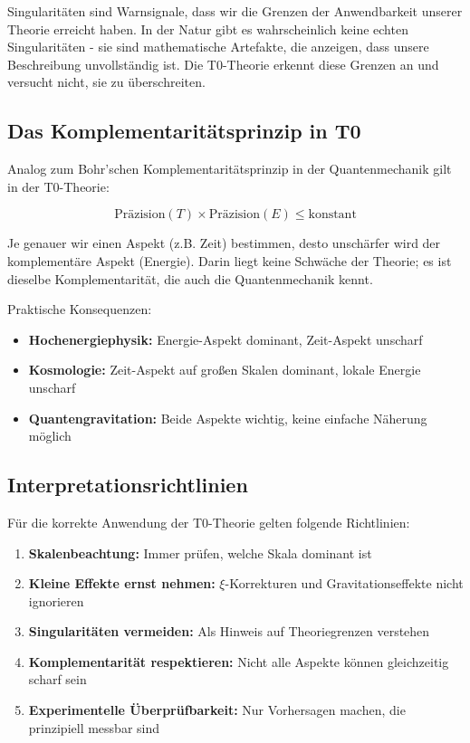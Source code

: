 	Singularitäten sind Warnsignale, dass wir die Grenzen der Anwendbarkeit unserer Theorie erreicht haben. In der Natur gibt es wahrscheinlich keine echten Singularitäten - sie sind mathematische Artefakte, die anzeigen, dass unsere Beschreibung unvollständig ist. Die T0-Theorie erkennt diese Grenzen an und versucht nicht, sie zu überschreiten.
	
	\subsection{Das Komplementaritätsprinzip in T0}
	
	Analog zum Bohr'schen Komplementaritätsprinzip in der Quantenmechanik gilt in der T0-Theorie:
	
	\begin{equation}
		\text{Präzision}(T) \times \text{Präzision}(E) \leq \text{konstant}
	\end{equation}
	
	Je genauer wir einen Aspekt (z.B. Zeit) bestimmen, desto unschärfer wird der komplementäre Aspekt (Energie). Darin liegt keine Schwäche der Theorie; es ist dieselbe Komplementarität, die auch die Quantenmechanik kennt.
	
	Praktische Konsequenzen:
	\begin{itemize}
		\item \textbf{Hochenergiephysik:} Energie-Aspekt dominant, Zeit-Aspekt unscharf
		\item \textbf{Kosmologie:} Zeit-Aspekt auf großen Skalen dominant, lokale Energie unscharf
		\item \textbf{Quantengravitation:} Beide Aspekte wichtig, keine einfache Näherung möglich
	\end{itemize}
	
	\subsection{Interpretationsrichtlinien}
	
	Für die korrekte Anwendung der T0-Theorie gelten folgende Richtlinien:
	
	\begin{enumerate}
		\item \textbf{Skalenbeachtung:} Immer prüfen, welche Skala dominant ist
		\item \textbf{Kleine Effekte ernst nehmen:} $\xi$-Korrekturen und Gravitationseffekte nicht ignorieren
		\item \textbf{Singularitäten vermeiden:} Als Hinweis auf Theoriegrenzen verstehen
		\item \textbf{Komplementarität respektieren:} Nicht alle Aspekte können gleichzeitig scharf sein
		\item \textbf{Experimentelle Überprüfbarkeit:} Nur Vorhersagen machen, die prinzipiell messbar sind
	\end{enumerate}
	
